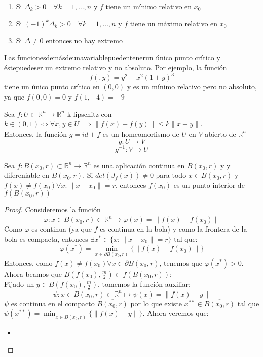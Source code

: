 \begin{teorema}
    \begin{enumerate}
        \item Si $\Delta_k > 0 \quad \forall k = 1, \ldots, n$ y $f$ tiene un mínimo relativo en $x_0$ 
        \item Si $(-1)^k \Delta_k > 0 \quad \forall k = 1, \ldots, n$ y $f$ tiene un máximo relativo en $x_0$
        \item Si $\Delta \neq 0$ entonces no hay extremo
    \end{enumerate}
\end{teorema}

\begin{observación}
    Las funcionesdemásdeunavariablepuedentenerun único punto crítico y éstepuedeser un extremo relativo y no absoluto. Por ejemplo, la función$$f(,y) =y^2 +x^2(1+ y)^3$$
    tiene un único punto crítico en $(0, 0)$ y es un mínimo relativo pero no absoluto, ya que $f(0,0) = 0$ y $f(1, -4) = -9$
\end{observación}

\begin{proposición}
    Sea $f: U \subset \mathbb{R}^n \to \mathbb{R}^n$ k-lipschitz con $k \in (0,1) \iff \forall x, y \in U \implies \|f(x) - f(y)\| \leq k \|x - y\|$. \\
    Entonces, la función $g = id +f$ es un homeomorfismo de $U$ en $V$-abierto de $\mathbb{R}^n$
    $$g: U \to V$$
    $$g^{-1}: V \to U$$
\end{proposición}

\begin{teorema}
    Sea $f: \overline{B(x_0, r)} \subset \mathbb{R}^n \to \mathbb{R}^n$ es una aplicación continua en $\overline{B(x_0, r)}$ y y difereniable en $B(x_0, r)$. Si $det(J_f(x)) \neq 0$ para todo $x \in B(x_0, r)$ y $f(x) \neq f(x_0) \forall x : \|x - x_0\| = r$, entonces $f(x_0)$ es un punto interior de $f(B(x_0, r))$
\end{teorema}
\begin{proof}
    Consideremos la función
    $$\varphi: x \in \overline{B(x_0, r)} \subset \mathbb{R}^n \mapsto \varphi(x) = \|f(x) - f(x_0)\|$$
    Como $\varphi$ es continua (ya que $f$ es continua en la bola) y como la frontera de la bola es compacta, entonces $\exists x^* \in \{x : \|x -x_0\| = r\}$ tal que: 
    $$\varphi(x^*) = \min_{x \in \partial B(x_0, r)} \{ \|f(x)-f(x_0)\|\}$$
    Entonces, como $f(x) \neq f(x_0) \forall x \in \partial B(x_0, r)$, tenemos que $\varphi(x^*) > 0$. 
    Ahora beamos que $B(f(x_0), \frac{m}{2}) \subset f(B(x_0, r))$: \\
    Fijado un $y \in B(f(x_0), \frac{m}{2})$, tomemos la función auxiliar:
    $$\psi: x \in \overline{B(x_0, r)} \subset \mathbb{R}^n \mapsto \psi(x) = \|f(x) - y\|$$
    $\psi$ es continua en el compacto $\overline{B(x_0, r)}$ por lo que existe $x^{**} \in \overline{B(x_0, r)}$ tal que $\psi(x^{**}) = \min_{x \in \overline{B(x_0, r)}} \{ \|f(x) - y\|\}$. Ahora veremos que: 
    \begin{itemize}
        \item 
    \end{itemize}
\end{proof}

